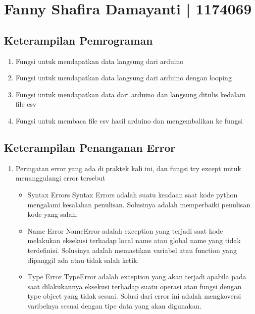 \section{Fanny Shafira Damayanti | 1174069}
\subsection{Keterampilan Pemrograman}
\begin{enumerate}
\item Fungsi untuk mendapatkan data langsung dari arduino



\item Fungsi untuk mendapatkan data langsung dari arduino dengan looping


\item Fungsi untuk mendapatkan data dari arduino dan langsung ditulis kedalam file csv


\item Fungsi untuk membaca file csv hasil arduino dan mengembalikan ke fungsi



\end{enumerate}

\subsection{Keterampilan Penanganan Error}
\begin{enumerate}
\item Peringatan error yang ada di praktek kali ini, dan fungsi try except untuk menanggulangi error tersebut

\begin{itemize}
	\item Syntax Errors
	Syntax Errors adalah suatu keadaan saat kode python mengalami kesalahan penulisan. Solusinya adalah memperbaiki penulisan kode yang salah.
	
	\item Name Error
	NameError adalah exception yang terjadi saat kode melakukan eksekusi terhadap local name atau global name yang tidak terdefinisi. Solusinya adalah memastikan variabel atau function yang dipanggil ada atau tidak salah ketik.
	
	\item Type Error
	TypeError adalah exception yang akan terjadi apabila pada saat dilakukannya eksekusi terhadap suatu operasi atau fungsi dengan type object yang tidak sesuai. Solusi dari error ini adalah mengkoversi varibelnya sesuai dengan tipe data yang akan digunakan.
\end{itemize}


\end{enumerate}

